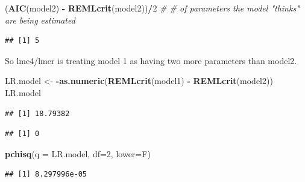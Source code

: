 \documentclass[
]{article}
\newenvironment{Shaded}{\begin{snugshade}}{\end{snugshade}}
\newcommand{\CommentTok}[1]{\textcolor[rgb]{0.56,0.35,0.01}{\textit{#1}}}
\newcommand{\DataTypeTok}[1]{\textcolor[rgb]{0.13,0.29,0.53}{#1}}
\newcommand{\DecValTok}[1]{\textcolor[rgb]{0.00,0.00,0.81}{#1}}
\newcommand{\KeywordTok}[1]{\textcolor[rgb]{0.13,0.29,0.53}{\textbf{#1}}}
\newcommand{\NormalTok}[1]{#1}
\newcommand{\OperatorTok}[1]{\textcolor[rgb]{0.81,0.36,0.00}{\textbf{#1}}}
\newcommand{\StringTok}[1]{\textcolor[rgb]{0.31,0.60,0.02}{#1}}
\begin{document}
\begin{Shaded}
\begin{Highlighting}[]
\NormalTok{(}\KeywordTok{AIC}\NormalTok{(model2) }\OperatorTok{-}\StringTok{ }\KeywordTok{REMLcrit}\NormalTok{(model2))}\OperatorTok{/}\DecValTok{2} \CommentTok{# # of parameters the model "thinks" are being estimated}
\end{Highlighting}
\end{Shaded}

\begin{verbatim}
## [1] 5
\end{verbatim}

So lme4/lmer is treating model 1 as having two more parameters than
model2.

\begin{Shaded}
\begin{Highlighting}[]
\NormalTok{LR.model <-}\StringTok{  }\OperatorTok{-}\KeywordTok{as.numeric}\NormalTok{(}\KeywordTok{REMLcrit}\NormalTok{(model1) }\OperatorTok{-}\StringTok{ }\KeywordTok{REMLcrit}\NormalTok{(model2))}
\NormalTok{LR.model}
\end{Highlighting}
\end{Shaded}

\begin{verbatim}
## [1] 18.79382
\end{verbatim}

\begin{Shaded}
\end{Shaded}

\begin{verbatim}
## [1] 0
\end{verbatim}

\begin{Shaded}
\begin{Highlighting}[]
\KeywordTok{pchisq}\NormalTok{(}\DataTypeTok{q =}\NormalTok{ LR.model, }\DataTypeTok{df=}\DecValTok{2}\NormalTok{, }\DataTypeTok{lower=}\NormalTok{F)}
\end{Highlighting}
\end{Shaded}

\begin{verbatim}
## [1] 8.297996e-05
\end{verbatim}

\begin{Shaded}
\end{Shaded}
\end{document}
